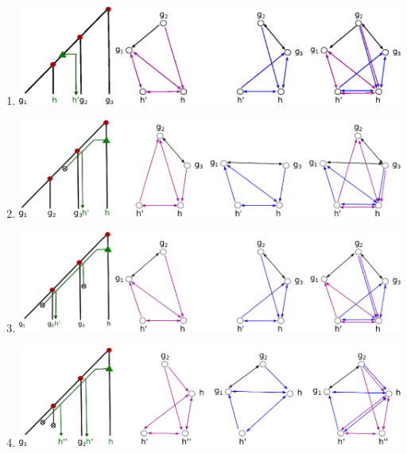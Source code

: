 \documentclass[10pt,a4paper,notitlepage]{article}
\begin{document}
\begin{enumerate}
\item
		\includegraphics[scale=0.7]{fig5}\\
\item
		\includegraphics[scale=0.7]{fig6}\\
\item
		\includegraphics[scale=0.7]{fig7} \\
\item
		\includegraphics[scale=0.7]{fig8} \\

\end{enumerate}


	
\end{document}
